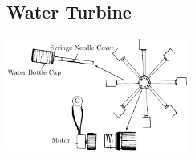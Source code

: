 \begin{multicols}{2}
%
%

\subsection{Water Turbine}

\begin{center}
\includegraphics[width=0.45\textwidth]{./img/water-turbine.png}
\end{center}


\end{multicols}
